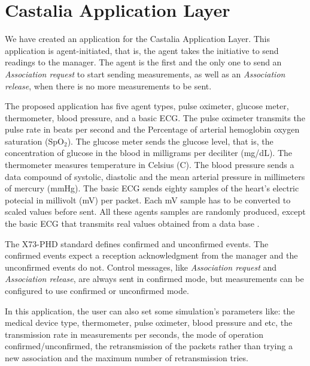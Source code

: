 \section{Castalia Application Layer}\label{castaliaapplayer}

We have created an application for the Castalia Application Layer. This application is agent-initiated, that is, the agent takes the initiative to send readings to the manager. The agent is the first and the only one to send an \textit{Association request} to start sending measurements, as well as an \textit{Association release}, when there is no more measurements to be sent.

The proposed application has five agent types, pulse oximeter, glucose meter, thermometer, blood pressure, and a basic ECG. The pulse oximeter transmits the pulse rate in beats per second and the Percentage of arterial hemoglobin oxygen saturation (SpO$_2$). The glucose meter sends the glucose level, that is, the concentration of glucose in the blood in milligrams per deciliter (mg\//dL). The thermometer measures temperature in Celsius (\textdegree C). The blood pressure sends a data compound of systolic, diastolic and the mean arterial pressure in millimeters of mercury (mmHg). The basic ECG sends eighty samples of the heart's electric potecial in millivolt (mV) per packet. Each mV sample has to be converted to scaled values before sent. 
All these agents samples are randomly produced, except the basic ECG that transmits real values obtained from a data base \cite{b2}.

The X73-PHD standard defines confirmed and unconfirmed events. The confirmed events expect a reception acknowledgment from the manager and the unconfirmed events do not. Control messages, like \textit{Association request} and \textit{Association release}, are always sent in confirmed mode, but measurements can be configured to use confirmed or unconfirmed mode. %

In this application, the user can also set some simulation's parameters like: the medical device type, thermometer, pulse oximeter, blood pressure and etc, the transmission rate in measurements per seconds, the mode of operation confirmed/unconfirmed, the retransmission of the packets rather than trying a new association and the maximum number of retransmission tries. 

